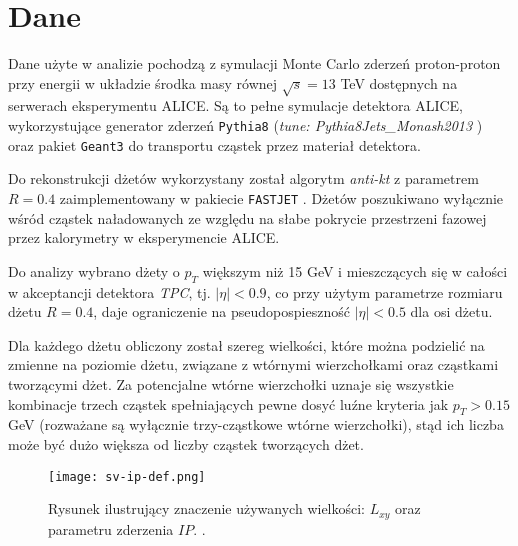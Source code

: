 \section{Dane}
\label{sec:dane}


Dane użyte w analizie pochodzą z symulacji Monte Carlo zderzeń proton-proton przy energii w układzie środka masy równej $\sqrt{s} = 13$ TeV dostępnych na serwerach eksperymentu ALICE.
Są to pełne symulacje detektora ALICE, wykorzystujące generator zderzeń \texttt{Pythia8} \cite{Sjostrand:2007gs} (\textit{tune: Pythia8Jets\_Monash2013} \cite{Skands:2014pea}) oraz pakiet \texttt{Geant3} \cite{Brun:1994aa} do transportu cząstek przez materiał detektora.

Do rekonstrukcji dżetów wykorzystany został algorytm \textit{anti-kt} z parametrem $R = 0.4$ zaimplementowany w pakiecie \texttt{FASTJET} \cite{Cacciari:2011ma}. Dżetów poszukiwano wyłącznie wśród cząstek naładowanych  ze względu na słabe pokrycie przestrzeni fazowej przez kalorymetry w eksperymencie ALICE.

Do analizy wybrano dżety o $p_T$ większym niż 15 GeV i mieszczących się w całości w akceptancji detektora \textit{TPC}, tj. $|\eta| < 0.9$, co przy użytym parametrze rozmiaru dżetu $R = 0.4$, daje ograniczenie na pseudopospieszność $|\eta| < 0.5$ dla osi dżetu.

Dla każdego dżetu obliczony został szereg wielkości, które można podzielić na zmienne na poziomie dżetu, związane z wtórnymi wierzchołkami oraz cząstkami tworzącymi dżet. 
Za potencjalne wtórne wierzchołki uznaje się wszystkie kombinacje trzech cząstek spełniających pewne dosyć luźne kryteria jak $p_T > 0.15$ GeV (rozważane są wyłącznie trzy-cząstkowe wtórne wierzchołki), stąd ich liczba może być dużo większa od liczby cząstek tworzących dżet.


\begin{figure}[h]
	\centering
	\texttt{[image: sv-ip-def.png]}
	\caption{Rysunek ilustrujący znaczenie używanych wielkości: $L_{xy}$ oraz parametru zderzenia $IP$. .}
	\label{fig:sv-ip-def}
\end{figure}

